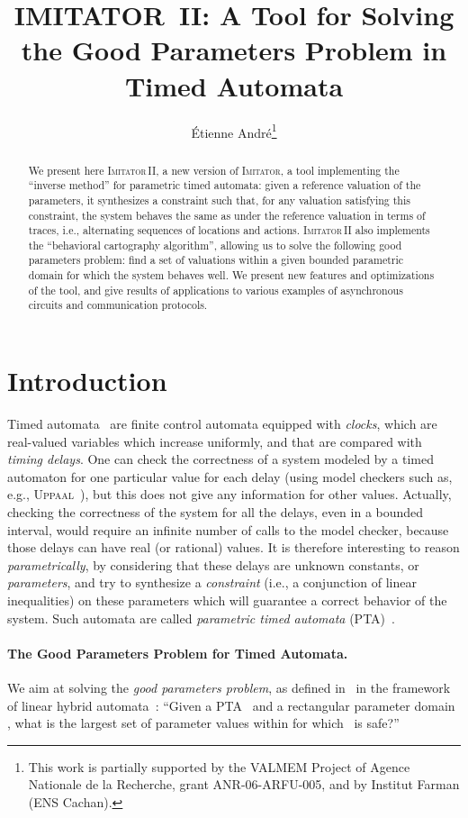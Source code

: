 \documentclass[submission,copyright,creativecommons]{eptcs}
\title{IMITATOR~II: A Tool for Solving \\ the Good Parameters Problem in Timed Automata}
\author{\'Etienne Andr\'e\thanks{This work is partially supported by the VALMEM Project of Agence Nationale de la Recherche, grant ANR-06-ARFU-005, and by Institut Farman (ENS Cachan).}
\institute{LSV, ENS de Cachan \& CNRS, Cachan, France}
\email{andre@lsv.ens-cachan.fr}
}
\newcommand{\imitator}{\textsc{Imitator}}
\newcommand{\imitatordeux}{\textsc{Imitator}\,II}
\newcommand{\uppaal}{\textsc{Uppaal}}
\newcommand{\paragraphe}[1]{\paragraph{#1.}}
\begin{document}
\maketitle


\begin{abstract}
We present here \imitatordeux{}, a new version of \imitator{}, a tool implementing the ``inverse method'' for parametric timed automata:
given a reference valuation of the parameters, it synthesizes a constraint such that, for any valuation satisfying this constraint, the system behaves the same as under the reference valuation in terms of traces, i.e., alternating sequences of locations and actions.
\imitatordeux{} also implements the ``behavioral cartography algorithm'', allowing us to solve the following good parameters problem: find a set of valuations within a given bounded parametric domain for which the system behaves well.
We present new features and optimizations of the tool, and give results of applications to various examples of asynchronous circuits and communication protocols.
\end{abstract}




\section{Introduction}


Timed automata~\cite{ad94} are finite control automata equipped with {\em clocks}, which are real-valued variables which increase uniformly, and that are compared with \emph{timing delays}.
One can check the correctness of a system modeled by a timed automaton for one particular value for each delay (using model checkers such as, e.g., \uppaal{}~\cite{lpy97}), but this does not give any information for other values.
Actually, checking the correctness of the system for all the delays, even in a bounded interval, would require an infinite number of calls to the model checker, because those delays can have real (or rational) values.
It is therefore interesting to reason \emph{parametrically}, by considering that these delays are unknown constants, or \emph{parameters}, and try to synthesize a {\em constraint} (i.e., a conjunction of linear inequalities) on these parameters which will guarantee a correct behavior of the system.
Such automata are called \emph{parametric timed automata} (PTA)~\cite{ahv93}. 

\paragraphe{The Good Parameters Problem for Timed Automata}
We aim at solving the \emph{good parameters problem}, as defined in~\cite{fjk08} in the framework of linear hybrid automata~\cite{achh92}:
``Given a PTA~ and a rectangular parameter domain , what is the largest set of parameter values within  for which~ is safe?''
\end{document}
